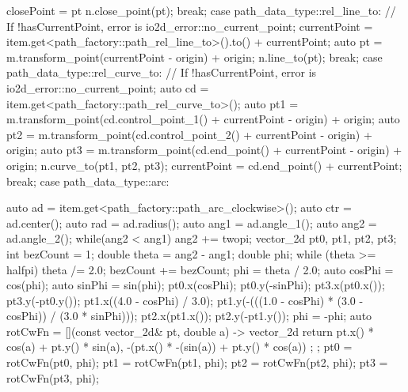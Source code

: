 \begin{codeblock}
{{{				closePoint = pt    
				n.close_point(pt);
			} break;
			case path_data_type::rel_line_to:
			{
				// If !hasCurrentPoint, error is io2d_error::no_current_point;
				currentPoint = item.get<path_factory::path_rel_line_to>().to() + currentPoint;
				auto pt = m.transform_point(currentPoint - origin) + origin;
				n.line_to(pt);
			} break;
			case path_data_type::rel_curve_to:
			{
				// If !hasCurrentPoint, error is io2d_error::no_current_point;
				auto cd = item.get<path_factory::path_rel_curve_to>();
				auto pt1 = m.transform_point(cd.control_point_1() + currentPoint -
				origin) + origin;
				auto pt2 = m.transform_point(cd.control_point_2() + currentPoint -
				origin) + origin;
				auto pt3 = m.transform_point(cd.end_point() + currentPoint - origin) +
				origin;
				n.curve_to(pt1, pt2, pt3);
				currentPoint = cd.end_point() + currentPoint;
			} break;
			case path_data_type::arc:
			{
				auto ad = item.get<path_factory::path_arc_clockwise>();
				auto ctr = ad.center();
				auto rad = ad.radius();
				auto ang1 = ad.angle_1();
				auto ang2 = ad.angle_2();
				while(ang2 < ang1) {
					ang2 += twopi;
				}
				vector_2d pt0, pt1, pt2, pt3;
				int bezCount = 1;
				double theta = ang2 - ang1;
				double phi;
				while (theta >= halfpi) {
					theta /= 2.0;
					bezCount += bezCount;
				}
				phi = theta / 2.0;
				auto cosPhi = cos(phi);
				auto sinPhi = sin(phi);
				pt0.x(cosPhi);
				pt0.y(-sinPhi);
				pt3.x(pt0.x());
				pt3.y(-pt0.y());
				pt1.x((4.0 - cosPhi) / 3.0);
				pt1.y(-(((1.0 - cosPhi) * (3.0 - cosPhi)) / (3.0 * sinPhi)));
				pt2.x(pt1.x());
				pt2.y(-pt1.y());
				phi = -phi;
				auto rotCwFn = [](const vector_2d& pt, double a) -> vector_2d {
					return { pt.x() * cos(a) + pt.y() * sin(a),
						-(pt.x() * -(sin(a)) + pt.y() * cos(a)) };
				};
				pt0 = rotCwFn(pt0, phi);
				pt1 = rotCwFn(pt1, phi);
				pt2 = rotCwFn(pt2, phi);
				pt3 = rotCwFn(pt3, phi);
				
}}}
\end{codeblock}
